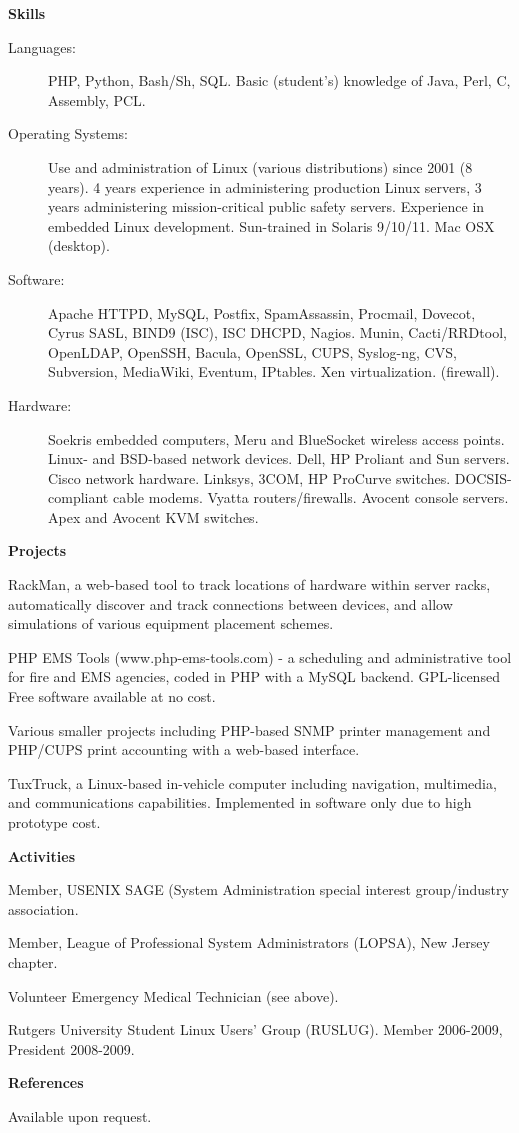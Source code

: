 \documentclass[letterpaper,11pt]{article}
\newcommand{\resheading}[1]{{\large \colorbox{mygrey}{\begin{minipage}{\textwidth}{\textbf{#1 \vphantom{p\^{E}}}}\end{minipage}}}}
\begin{document}
\resheading{Skills}

\begin{description}
\item[Languages:]
PHP, Python, Bash/Sh, SQL. Basic (student's) knowledge of Java, Perl, C, Assembly,
PCL. 
\item[Operating Systems:]
Use and administration of Linux (various distributions) since 2001 (8
years). 4 years experience in administering production Linux servers, 3 years
administering mission-critical public safety servers. Experience in embedded
Linux development. 
Sun-trained in Solaris 9/10/11. Mac OSX (desktop). 
\item[Software:]
Apache HTTPD, MySQL, Postfix, SpamAssassin, Procmail, Dovecot, Cyrus SASL, BIND9 (ISC), ISC
DHCPD, Nagios. Munin, Cacti/RRDtool, OpenLDAP, OpenSSH, Bacula,
OpenSSL, CUPS, Syslog-ng, CVS, Subversion, MediaWiki, Eventum, IPtables. Xen
virtualization. 
(firewall).
\item[Hardware:]
Soekris embedded computers, Meru and BlueSocket wireless access points. Linux-
and BSD-based network devices. Dell,
HP Proliant and Sun servers. Cisco network hardware. Linksys, 3COM, HP
ProCurve switches. DOCSIS-compliant cable
modems. Vyatta routers/firewalls. Avocent console servers. Apex and
Avocent KVM switches.
\end{description}

\resheading{Projects}

\begin{description}
\item[In Progress] RackMan, a web-based tool to track locations of hardware
  within server racks, automatically discover and track connections between
  devices, and allow simulations of various equipment placement schemes.
\item[2007--Present] PHP EMS Tools (www.php-ems-tools.com) - a scheduling and
  administrative tool for fire and EMS agencies, coded in PHP with a MySQL
  backend. GPL-licensed Free software available at no cost.
\item Various smaller projects including PHP-based SNMP printer management and
PHP/CUPS print accounting with a web-based interface.
\item TuxTruck, a Linux-based in-vehicle computer including navigation,
  multimedia, and communications capabilities. Implemented in software only
  due to high prototype cost.
\end{description}

\resheading{Activities}
	\begin{description}
		\item Member, USENIX SAGE (System Administration special
                  interest group/industry association.
                \item Member, League of Professional System Administrators
                  (LOPSA), New Jersey chapter.
                \item Volunteer Emergency Medical Technician (see above).
                \item Rutgers University Student Linux Users' Group
                  (RUSLUG). Member 2006-2009, President 2008-2009.
	\end{description}

\resheading{References}
\begin{description}
\item{Available upon request.}
\end{description}
\end{document}
